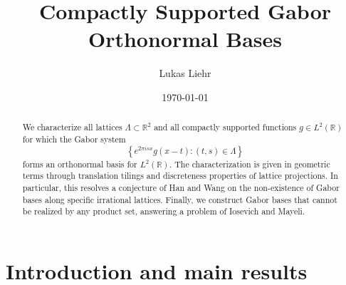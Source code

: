 \documentclass[reqno,a4paper,12pt]{amsart}
\numberwithin{equation}{section}
\def\R{{\mathbb R}}
\newcommand\1{\mathds{1}}
\begin{document}
\title[Compactly Supported Gabor Orthonormal Bases]{Compactly Supported Gabor Orthonormal Bases}

\author[Lukas Liehr]{Lukas Liehr}
\address{Department of Mathematics, Bar-Ilan University, Ramat-Gan 5290002, Israel}

\date{\today}

\begin{abstract}
We characterize all lattices $\Lambda \subset \R^2$ and all compactly supported functions $g \in L^2(\R)$ for which the Gabor system $$\left \{ e^{2\pi i s x} g(x-t) : (t,s) \in \Lambda \right \}$$ forms an orthonormal basis for $L^2(\R)$. The characterization is given in geometric terms through translation tilings and discreteness properties of lattice projections. In particular, this resolves a conjecture of Han and Wang on the non-existence of Gabor bases along specific irrational lattices. Finally, we construct Gabor bases that cannot be realized by any product set, answering a problem of Iosevich and Mayeli.
\end{abstract}

\maketitle

\section{Introduction and main results}
\end{document}

